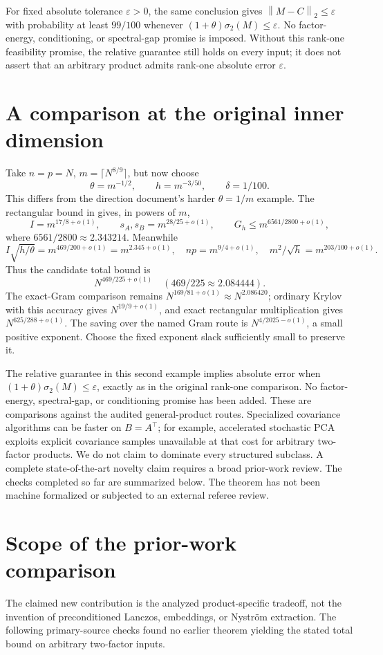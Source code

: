 \documentclass[11pt]{article}
\newcommand{\norm}[1]{\left\lVert#1\right\rVert}
\begin{document}
For fixed absolute tolerance \(\varepsilon>0\), the same conclusion gives
\(\norm{M-C}_2\leq\varepsilon\) with probability at least \(99/100\)
whenever \((1+\theta)\sigma_2(M)\leq\varepsilon\). No factor-energy,
conditioning, or spectral-gap promise is imposed. Without this rank-one
feasibility promise, the relative guarantee still holds on every input;
it does not assert that an arbitrary product admits rank-one absolute error
\(\varepsilon\).

\section{A comparison at the original inner dimension}
Take \(n=p=N\), \(m=\lceil N^{8/9}\rceil\), but now choose
\[
 \theta=m^{-1/2},\qquad h=m^{-3/50},\qquad\delta=1/100.
\]
This differs from the direction document's harder \(\theta=1/m\) example.
The rectangular bound in \cite{amanov} gives, in powers of \(m\),
\[
 I=m^{17/8+o(1)},\qquad s_A,s_B=m^{28/25+o(1)},\qquad
 G_h\leq m^{6561/2800+o(1)},
\]
where \(6561/2800\approx2.343214\). Meanwhile
\[
 I\sqrt{h/\theta}=m^{469/200+o(1)}=m^{2.345+o(1)},\quad
 np=m^{9/4+o(1)},\quad m^2/\sqrt h=m^{203/100+o(1)}.
\]
Thus the candidate total bound is
\[
 N^{469/225+o(1)}\quad(469/225\approx2.084444).
\]
The exact-Gram comparison remains
\(N^{169/81+o(1)}\approx N^{2.086420}\); ordinary Krylov with this
accuracy gives \(N^{19/9+o(1)}\), and exact rectangular multiplication
gives \(N^{625/288+o(1)}\). The saving over the named Gram route is
\(N^{4/2025-o(1)}\), a small positive exponent. Choose the fixed exponent
slack sufficiently small to preserve it.

The relative guarantee in this second example implies absolute error when
\((1+\theta)\sigma_2(M)\leq\varepsilon\), exactly as in the original
rank-one comparison. No factor-energy, spectral-gap, or conditioning promise
has been added. These are comparisons against the audited general-product
routes. Specialized covariance algorithms can be faster on
\(B=A^\top\); for example, accelerated stochastic PCA \cite{garber}
exploits explicit covariance samples unavailable at that cost for arbitrary
two-factor products. We do not claim to dominate every structured subclass.
A complete state-of-the-art novelty claim requires a broad prior-work review.
The checks completed so far are summarized below. The theorem has not been
machine formalized or subjected to an external referee review.

\section{Scope of the prior-work comparison}
The claimed new contribution is the analyzed product-specific tradeoff, not
the invention of preconditioned Lanczos, embeddings, or Nystr\"om extraction.
The following primary-source checks found no earlier theorem yielding the
stated total bound on arbitrary two-factor inputs.
\end{document}
